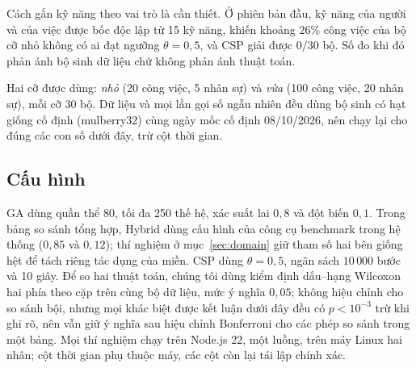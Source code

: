 \documentclass{IEEEtran}
\begin{document}
Cách gắn kỹ năng theo vai trò là cần thiết. Ở phiên bản đầu, kỹ năng của người và của việc được bốc độc lập từ 15 kỹ năng, khiến khoảng 26\% công việc của bộ cỡ nhỏ không có ai đạt ngưỡng $\theta=0{,}5$, và CSP giải được $0/30$ bộ. Số đo khi đó phản ánh bộ sinh dữ liệu chứ không phản ánh thuật toán.

Hai cỡ được dùng: \emph{nhỏ} (20 công việc, 5 nhân sự) và \emph{vừa} (100 công việc, 20 nhân sự), mỗi cỡ 30 bộ. Dữ liệu và mọi lần gọi số ngẫu nhiên đều dùng bộ sinh có hạt giống cố định (mulberry32) cùng ngày mốc cố định 08/10/2026, nên chạy lại cho đúng các con số dưới đây, trừ cột thời gian.

\subsection{Cấu hình}

GA dùng quần thể 80, tối đa 250 thế hệ, xác suất lai $0{,}8$ và đột biến $0{,}1$. Trong bảng so sánh tổng hợp, Hybrid dùng cấu hình của công cụ benchmark trong hệ thống ($0{,}85$ và $0{,}12$); thí nghiệm ở mục~\ref{sec:domain} giữ tham số hai bên giống hệt để tách riêng tác dụng của miền. CSP dùng $\theta=0{,}5$, ngân sách $10\,000$ bước và 10 giây. Để so hai thuật toán, chúng tôi dùng kiểm định dấu--hạng Wilcoxon hai phía theo cặp trên cùng bộ dữ liệu, mức ý nghĩa $0{,}05$; không hiệu chỉnh cho so sánh bội, nhưng mọi khác biệt được kết luận dưới đây đều có $p<10^{-3}$ trừ khi ghi rõ, nên vẫn giữ ý nghĩa sau hiệu chỉnh Bonferroni cho các phép so sánh trong một bảng. Mọi thí nghiệm chạy trên Node.js 22, một luồng, trên máy Linux hai nhân; cột thời gian phụ thuộc máy, các cột còn lại tái lập chính xác.
\end{document}
